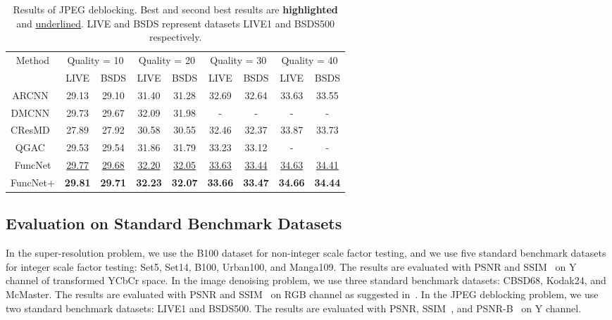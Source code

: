 \documentclass{article}
\begin{document}
{\begin{table}
\caption{Results of JPEG deblocking. Best and second best results are \textbf{highlighted} and \underline{underlined}. LIVE and BSDS represent datasets LIVE1 and BSDS500 respectively.}
\label{tab:table4}
\begin{tabular}{|c|c|c|c|c|c|c|c|c|}
\hline
\multirow{2}{*}{Method} & \multicolumn{2}{c|}{Quality = 10} & \multicolumn{2}{c|}{Quality = 20} & \multicolumn{2}{c|}{Quality = 30} & \multicolumn{2}{c|}{Quality = 40} \\ \cline{2-9}
& LIVE & BSDS & LIVE & BSDS & LIVE & BSDS & LIVE & BSDS \\ \hline
ARCNN~\cite{dong2015compression} & 29.13 & 29.10 & 31.40 & 31.28 & 32.69 & 32.64 & 33.63 & 33.55 \\
DMCNN~\cite{zhang2018dmcnn} & 29.73 & 29.67 & 32.09 & 31.98 & - & - & - & - \\
CResMD~\cite{he2020interactive} & 27.89 & 27.92 & 30.58 & 30.55 & 32.46 & 32.37 & 33.87 & 33.73 \\
QGAC~\cite{ehrlich2020quantization} & 29.53 & 29.54 & 31.86 & 31.79 & 33.23 & 33.12 & - & - \\
FuncNet & \underline{29.77} & \underline{29.68} & \underline{32.20} & \underline{32.05} & \underline{33.63} & \underline{33.44} & \underline{34.63} & \underline{34.41} \\
FuncNet+ & \textbf{29.81} & \textbf{29.71} & \textbf{32.23} & \textbf{32.07} & \textbf{33.66} & \textbf{33.47} & \textbf{34.66} & \textbf{34.44} \\ \hline
\end{tabular}
\end{table}
\clearpage
}

\subsection{Evaluation on Standard Benchmark Datasets}

In the super-resolution problem, we use the B100 dataset for non-integer scale factor testing, and we use five standard benchmark datasets for integer scale factor testing: Set5, Set14, B100, Urban100, and Manga109. The results are evaluated with PSNR and SSIM~\cite{wang2004image} on Y channel of transformed YCbCr space. In the image denoising problem, we use three standard benchmark datasets: CBSD68, Kodak24, and McMaster. The results are evaluated with PSNR and SSIM~\cite{wang2004image} on RGB channel as suggested in~\cite{zhang2017beyond}. In the JPEG deblocking problem, we use two standard benchmark datasets: LIVE1 and BSDS500. The results are evaluated with PSNR, SSIM~\cite{wang2004image}, and PSNR-B~\cite{yim2010quality} on Y channel.
\end{document}
